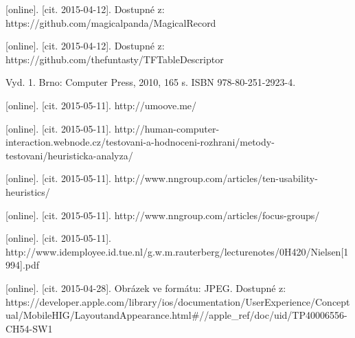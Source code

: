 \documentclass[twoside,12pt]{article}
\begin{document}
\begin{literatura}
{
	[online]. [cit. 2015-04-12]. Dostupné z: https://github.com/magicalpanda/MagicalRecord
}

{
	[online]. [cit. 2015-04-12]. Dostupné z: https://github.com/thefuntasty/TFTableDescriptor
}

{
	Vyd. 1. Brno: Computer Press, 2010, 165 s. ISBN 978-80-251-2923-4.
}

{
	[online]. [cit. 2015-05-11]. http://umoove.me/
}

{
	[online]. [cit. 2015-05-11]. http://human-computer-interaction.webnode.cz/testovani-a-hodnoceni-rozhrani/metody-testovani/heuristicka-analyza/
}

{
	[online]. [cit. 2015-05-11]. http://www.nngroup.com/articles/ten-usability-heuristics/
}

{
	[online]. [cit. 2015-05-11]. http://www.nngroup.com/articles/focus-groups/
}

{
	[online]. [cit. 2015-05-11]. http://www.idemployee.id.tue.nl/g.w.m.rauterberg/lecturenotes/0H420/Nielsen[1994].pdf
}




{
	[online]. [cit. 2015-04-28]. 
	Obrázek ve formátu: JPEG. Dostupné z: https://developer.apple.com/library/ios/documentation/UserExperience/Conceptual/MobileHIG/LayoutandAppearance.html\#//apple\_ref/doc/uid/TP40006556-CH54-SW1
}

%




\end{literatura}
\end{document}
